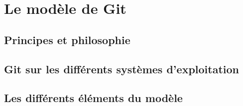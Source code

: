 \cite{Baire2} %


\section{Le modèle de Git} %


\subsection{Principes et philosophie} %


\subsection{Git sur les différents systèmes d'exploitation}\label{GitOS} %

\subsection{Les différents éléments du modèle} %



